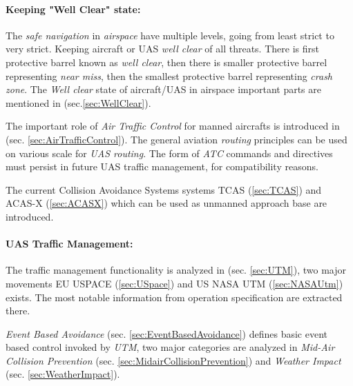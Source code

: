 \paragraph{Keeping "Well Clear" state:} The \emph{safe navigation} in \emph{airspace} have multiple levels, going from least strict to very strict. Keeping aircraft or UAS \emph{well clear} of all threats. There is first protective barrel known as \emph{well clear}, then there is smaller protective barrel representing \emph{near miss}, then the smallest protective barrel representing \emph{crash zone}. The \emph{Well clear} state of aircraft/UAS in airspace  important parts are mentioned in (sec.\ref{sec:WellClear}). 

The important role of \emph{Air Traffic Control} for manned aircrafts is introduced in  (sec. \ref{sec:AirTrafficControl}). The general aviation \emph{routing} principles can be used on various scale for \emph{UAS routing}. The form of \emph{ATC} commands and directives must persist in future UAS traffic management, for compatibility reasons.

The current Collision Avoidance Systems systems TCAS (\ref{sec:TCAS}) and ACAS-X (\ref{sec:ACASX}) which can be used as unmanned approach base are introduced.

\paragraph{UAS Traffic Management:} The traffic management functionality is analyzed in (sec. \ref{sec:UTM}), two major movements EU USPACE (\ref{sec:USpace}) and US NASA UTM (\ref{sec:NASAUtm}) exists. The most notable information from operation specification are extracted there.

\emph{Event Based Avoidance} (sec. \ref{sec:EventBasedAvoidance}) defines basic event based control invoked by \emph{UTM}, two major categories are analyzed in \emph{Mid-Air Collision Prevention} (sec. \ref{sec:MidairCollisionPrevention}) and \emph{Weather Impact} (sec. \ref{sec:WeatherImpact}).